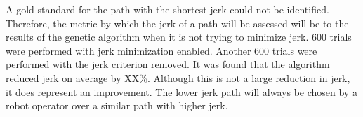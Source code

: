 A gold standard for the path with the shortest jerk could not be identified. Therefore, the metric by which the jerk of a path will be assessed will be to the results of the genetic algorithm when it is not trying to minimize jerk. 600 trials were performed with jerk minimization enabled. Another 600 trials were performed with the jerk criterion removed. It was found that the algorithm reduced jerk on average by XX\%. Although this is not a large reduction in jerk, it does represent an improvement. The lower jerk path will always be chosen by a robot operator over a similar path with higher jerk.



